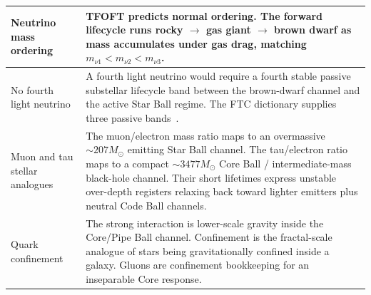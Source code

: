 \documentclass[11pt,a4paper]{article}
\begin{document}
\begin{center}
\begin{longtable}{|L{4.25cm}|L{9.85cm}|}
\hline
Neutrino mass ordering & TFOFT predicts normal ordering. The forward lifecycle runs rocky \(\to\) gas giant \(\to\) brown dwarf as mass accumulates under gas drag, matching \(m_{\nu 1}<m_{\nu 2}<m_{\nu 3}\). \\
\hline
No fourth light neutrino & A fourth light neutrino would require a fourth stable passive substellar lifecycle band between the brown-dwarf channel and the active Star Ball regime. The FTC dictionary supplies three passive bands~\cite{KATRIN2025,PDG2024,ALEPH1998TauNu,Spiegel2011}. \\
\hline
Muon and tau stellar analogues & The muon/electron mass ratio maps to an overmassive \(\sim207M_\odot\) emitting Star Ball channel. The tau/electron ratio maps to a compact \(\sim3477M_\odot\) Core Ball / intermediate-mass black-hole channel. Their short lifetimes express unstable over-depth registers relaxing back toward lighter emitters plus neutral Code Ball channels. \\
\hline
Quark confinement & The strong interaction is lower-scale gravity inside the Core/Pipe Ball channel. Confinement is the fractal-scale analogue of stars being gravitationally confined inside a galaxy. Gluons are confinement bookkeeping for an inseparable Core response. \\
\hline


\end{longtable}
\end{center}
\end{document}
